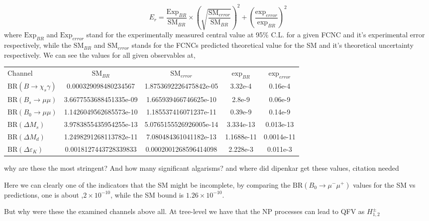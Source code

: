 \begin{equation}
E_r = \frac{\text{Exp}_{BR}}{\text{SM}_{BR}} \times \left( \sqrt{\frac{\text{SM}_{error}}{\text{SM}_{BR}}}\right)^2 + \left( \frac{\text{exp}_{error}}{\text{exp}_{BR}} \right)^2
\end{equation} 
%
where $\text{Exp}_{BR}$ and $\text{Exp}_{error}$ stand for the experimentally measured central value at 95\% C.L. for a given FCNC and it's experimental error respectively, while the $\text{SM}_{BR}$ and $\text{SM}_{error}$ stands for the FCNCs predicted theoretical value for the SM and it's theoretical uncertainty respectively.  	
% 
We can see the values for all given observables at, 
%
\begin{table}[H]
\centering
\begin{tabular}{l|cccc}
 Channel & $\text{SM}_{BR}$         & $\text{SM}_{error}$ & $\text{exp}_{BR}$ & $\text{exp}_{error}$   \\ \cline{2-5} 
$\text{BR}( B \rightarrow \chi_s \gamma )$ & 0.000329098480234567   & 1.8753692226475842e-05                  & 3.32e-4    & 0.16e-4       \\
$\text{BR}( B_s \rightarrow \mu \mu ) $ & 3.6677553688451335e-09 & 1.665939466746625e-10                   & 2.8e-9     & 0.06e-9       \\
$\text{BR}(B_0 \rightarrow  \mu \mu )$ & 1.1426049562685573e-10 & 1.185537416071237e-11                   & 0.39e-9    & 0.14e-9       \\
$\text{BR}( \Delta M_s ) $ & 3.9783855435954255e-13 & 5.0765155526926005e-14                  & 3.334e-13  &  0.013e-13     \\
$\text{BR}( \Delta M_d )$ & 1.2498291268113782e-11 & 7.080484361041182e-13                   & 1.1688e-11 & 0.0014e-11    \\
$\text{BR}(\Delta \varepsilon_K )$ & 0.0018127443728339833  & 0.0002001268596414098                   & 2.228e-3   & 0.011e-3     
\end{tabular}
\end{table}

{ \color{red} why are these the most stringent? And how many significant algarisms? and where did dipenkar get these values, citation needed} 

Here we can clearly one of the indicators that the SM might be incomplete, by comparing the $\text{BR}(B_0 \rightarrow \mu^- \mu^+ )$ values for the SM vs predictions, one is about ,$2\times10^{-10}$, while the SM bound is $1.26\times10^{-10}$. 

But why were these the examined channels above all. At tree-level we have that the NP processes can lead to QFV as 
$H^\pm_{1,2}$  

